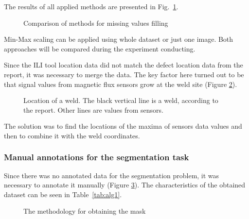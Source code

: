 The results of all applied methods are presented in Fig.~\ref{ris:filling_example}.
\begin{figure}[ht]
	\caption{Comparison of methods for missing values filling}
	\label{ris:filling_example}
\end{figure}

Min-Max scaling can be applied using whole dataset or just one image.
Both approaches will be compared during the experiment conducting.

Since the ILI tool location data did not match the defect location data from the report, it was necessary to merge the data. The key factor here turned out to be that signal values from magnetic flux sensors grow at the weld site (Figure \ref{ris:prepr}). 

\begin{figure}[!h]
	\caption{Location of a weld. The black vertical line is a weld, according to the report. Other lines are values from sensors.}
	\label{ris:prepr}
\end{figure}
The solution was to find the locations of the maxima of sensors data values and then to combine it with the weld coordinates.

\subsubsection{Manual annotations for the segmentation task}
Since there was no annotated data for the segmentation problem, it was necessary to annotate it manually (Figure \ref{ris:annot}). The characteristics of the obtained dataset can be seen in Table~\ref{tab:alg1}.

\begin{figure}[ht]
	\caption{The methodology for obtaining the mask}
	\label{ris:annot}
\end{figure}

